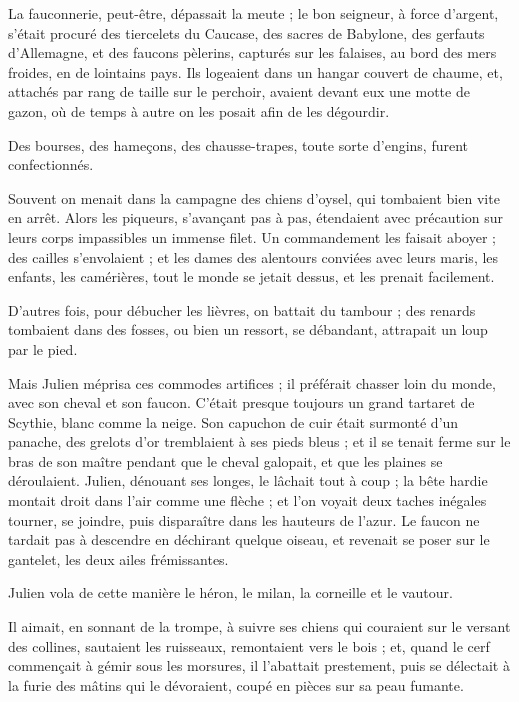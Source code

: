 \documentclass[]{book}
\begin{document}
                La fauconnerie, peut-être, dépassait la meute ; le bon seigneur, à force d'argent, s'était procuré des tiercelets du Caucase, des sacres de Babylone, des gerfauts d'Allemagne, et des faucons pèlerins, capturés sur les falaises, au bord des mers froides, en de lointains pays. Ils logeaient dans un hangar couvert de chaume, et, attachés par rang de taille sur le perchoir, avaient devant eux une motte de gazon, où de temps à autre on les posait afin de les dégourdir.
                    
                Des bourses, des hameçons, des chausse-trapes, toute sorte d'engins, furent confectionnés.
                    
                Souvent on menait dans la campagne des chiens d'oysel, qui tombaient bien vite en arrêt. Alors les piqueurs, s'avançant pas à pas, étendaient avec précaution sur leurs corps impassibles un immense filet. Un commandement les faisait aboyer ; des cailles s'envolaient ; et les dames des alentours conviées avec leurs maris, les enfants, les camérières, tout le monde se jetait dessus, et les prenait facilement.
                    
                D'autres fois, pour débucher les lièvres, on battait du tambour ; des renards tombaient dans des fosses, ou bien un ressort, se débandant, attrapait un loup par le pied.
                    
                Mais Julien méprisa ces commodes artifices ; il préférait chasser loin du monde, avec son cheval et son faucon. C'était presque toujours un grand tartaret de Scythie, blanc comme la neige. Son capuchon de cuir était surmonté d'un panache, des grelots d'or tremblaient à ses pieds bleus ; et il se tenait ferme sur le bras de son maître pendant que le cheval galopait, et que les plaines se déroulaient. Julien, dénouant ses longes, le lâchait tout à coup ; la bête hardie montait droit dans l'air comme une flèche ; et l'on voyait deux taches inégales tourner, se joindre, puis disparaître dans les hauteurs de l'azur. Le faucon ne tardait pas à descendre en déchirant quelque oiseau, et revenait se poser sur le gantelet, les deux ailes frémissantes.
                    
                Julien vola de cette manière le héron, le milan, la corneille et le vautour.
                    
                Il aimait, en sonnant de la trompe, à suivre ses chiens qui couraient sur le versant des collines, sautaient les ruisseaux, remontaient vers le bois ; et, quand le cerf commençait à gémir sous les morsures, il l'abattait prestement, puis se délectait à la furie des mâtins qui le dévoraient, coupé en pièces sur sa peau fumante.
                    
\end{document}
